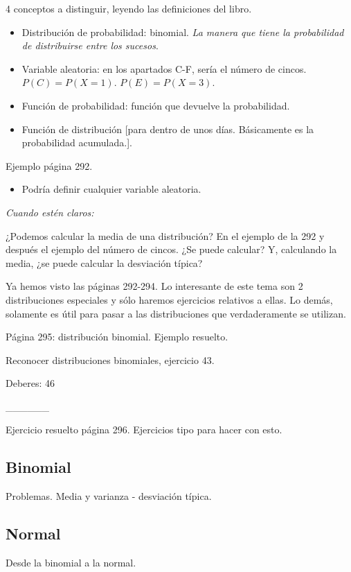 4 conceptos a distinguir, leyendo las definiciones del libro.
\begin{itemize}
	\item Distribución de probabilidad: binomial.
	\subitem \textit{La manera que tiene la probabilidad de distribuirse entre los sucesos}.
	\item Variable aleatoria: en los apartados C-F, sería el número de cincos.
	\subitem $P(C) = P(X=1)$.
	\subitem $P(E) = P(X=3)$.
	\item Función de probabilidad: función que devuelve la probabilidad.
	\item Función de distribución [para dentro de unos días. Básicamente es la probabilidad acumulada.].
\end{itemize}

Ejemplo página 292.
\begin{itemize}
	\item Podría definir cualquier variable aleatoria.
\end{itemize}


\textit{Cuando estén claros:} 

¿Podemos calcular la media de una distribución? En el ejemplo de la 292 y después el ejemplo del número de cincos. ¿Se puede calcular? Y, calculando la media, ¿se puede calcular la desviación típica?

Ya hemos visto las páginas 292-294. Lo interesante de este tema son 2 distribuciones especiales y sólo haremos ejercicios relativos a ellas. Lo demás, solamente es útil para pasar a las distribuciones que verdaderamente se utilizan.

Página 295: distribución binomial. Ejemplo resuelto.

Reconocer distribuciones binomiales, ejercicio 43.

Deberes: 46


______

Ejercicio resuelto página 296. Ejercicios tipo para hacer con esto.

\subsection{Binomial}

Problemas. Media y varianza - desviación típica.

\subsection{Normal}

Desde la binomial a la normal.

